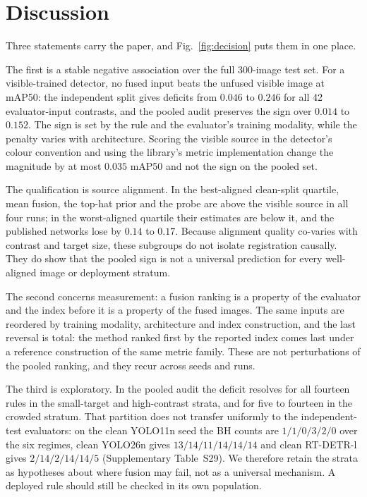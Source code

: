\documentclass[preprint,10pt]{elsarticle}
\begin{document}
\section{Discussion}
\label{sec:discussion}

\begin{sloppypar}
Three statements carry the paper, and Fig.~\ref{fig:decision} puts them in one place.

The first is a stable negative association over the full 300-image test set. For a
visible-trained detector, no fused input beats the unfused visible image at mAP50:
the independent split gives deficits from $0.046$ to $0.246$ for all 42
evaluator-input contrasts, and the pooled audit preserves the sign over $0.014$ to
$0.152$. The sign is set by the rule and
the evaluator's training modality, while the penalty varies with architecture. Scoring
the visible source in the detector's colour convention and using
the library's metric implementation change the magnitude by at most $0.035$ mAP50 and not
the sign on the pooled set.

The qualification is source alignment. In the best-aligned clean-split quartile, mean
fusion, the top-hat prior and the probe are above the visible source in all four runs; in
the worst-aligned quartile their estimates are below it, and the published networks lose
by $0.14$ to $0.17$. Because alignment quality co-varies with contrast and target size,
these subgroups do not isolate registration causally. They do show that the pooled sign is
not a universal prediction for every well-aligned image or deployment stratum.

The second concerns measurement: a fusion ranking is a property of the evaluator and the
index before it is a property of the fused images. The same inputs are reordered by
training modality, architecture and index construction, and the last reversal is total:
the method ranked first by the reported index comes last under a reference construction
of the same metric family. These are not perturbations of the pooled ranking, and they
recur across seeds and runs.

The third is exploratory. In the pooled audit the deficit resolves for all fourteen
rules in the small-target and high-contrast strata, and for five to fourteen in the
crowded stratum. That partition does not transfer uniformly to the independent-test
evaluators: on the clean YOLO11n seed the BH counts are $1/1/0/3/2/0$ over the six
regimes, clean YOLO26n gives $13/14/11/14/14/14$ and clean RT-DETR-l gives
$2/14/2/14/14/5$
(Supplementary Table~S29). We therefore retain the strata as
hypotheses about where fusion may fail, not as a universal mechanism. A deployed rule
should still be checked in its own population.


\end{sloppypar}
\end{document}
